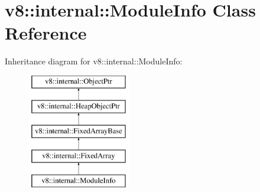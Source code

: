 \hypertarget{classv8_1_1internal_1_1ModuleInfo}{}\section{v8\+:\+:internal\+:\+:Module\+Info Class Reference}
\label{classv8_1_1internal_1_1ModuleInfo}
Inheritance diagram for v8\+:\+:internal\+:\+:Module\+Info\+:\begin{figure}[H]
\begin{center}
\leavevmode
\includegraphics[height=5.000000cm]{classv8_1_1internal_1_1ModuleInfo}
\end{center}
\end{figure}
